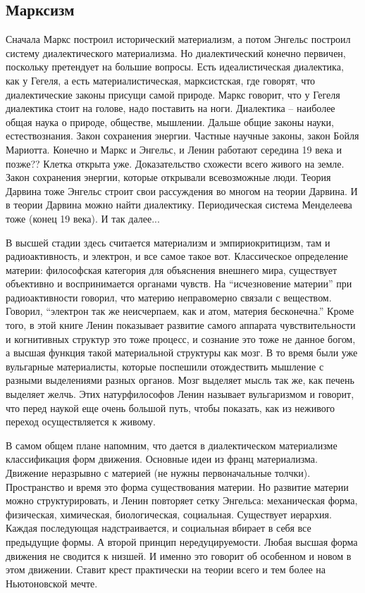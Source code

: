 \documentclass[a4paper, 12pt]{article}
\begin{document}
\subsection{Марксизм}
Сначала Маркс построил исторический материализм, а потом Энгельс 
построил систему диалектического материализма. Но диалектический конечно 
первичен, поскольку претендует на большие вопросы. Есть идеалистическая 
диалектика, как у Гегеля, а есть материалистическая, марксистская, где 
говорят, что диалектические законы присущи самой природе. Маркс говорит, 
что у Гегеля диалектика стоит на голове, надо поставить на ноги. 
Диалектика -- наиболее общая наука о природе, обществе, мышлении. Дальше 
общие законы науки, естествознания. Закон сохранения энергии. Частные 
научные законы, закон Бойля Мариотта. Конечно и Маркс и Энгельс, и Ленин 
работают середина 19 века и позже?? Клетка открыта уже. Доказательство 
схожести всего живого на земле. Закон сохранения энергии, которые 
открывали всевозможные люди. Теория Дарвина тоже Энгельс строит свои 
рассуждения во многом на теории Дарвина. И в теории Дарвина можно найти 
диалектику. Периодическая система Менделеева тоже (конец 19 века). И так 
далее...

В высшей стадии здесь считается материализм и эмпириокритицизм, там 
и радиоактивность, и электрон, и все самое такое вот. Классическое 
определение материи: философская категория для объяснения внешнего мира, 
существует объективно и воспринимается органами чувств. На 
``исчезновение материи'' при радиоактивности говорил, что материю 
неправомерно связали с веществом. Говорил, ``электрон так же 
неисчерпаем, как и атом, материя бесконечна.'' Кроме того, в этой книге 
Ленин показывает развитие самого аппарата чувствительности и когнитивных 
структур это тоже процесс, и сознание это тоже не данное богом, а высшая 
функция такой материальной структуры как мозг. В то время были уже 
вульгарные материалисты, которые поспешили отождествить мышление 
с разными выделениями разных органов. Мозг выделяет мысль так же, как 
печень выделяет желчь. Этих натурфилософов Ленин называет вульгаризмом 
и говорит, что перед наукой еще очень большой путь, чтобы показать, как 
из неживого переход осуществляется к живому.

В самом общем плане напомним, что дается в диалектическом материализме 
классификация форм движения. Основные идеи из франц материализма. 
Движение неразрывно с материей (не нужны первоначальные толчки). 
Пространство и время это форма существования материи. Но развитие 
материи можно структурировать, и Ленин повторяет сетку Энгельса: 
механическая форма, физическая, химическая, биологическая, социальная. 
Существует иерархия. Каждая последующая надстраивается, и социальная 
вбирает в себя все предыдущие формы. А второй принцип нередуцируемости. 
Любая высшая форма движения не сводится к низшей. И именно это говорит 
об особенном и новом в этом движении. Ставит крест практически на теории 
всего и тем более на Ньютоновской мечте.
\end{document}
